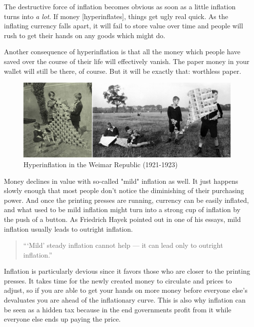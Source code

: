 The destructive force of inflation becomes obvious as soon as a little
inflation turns into \textit{a lot}. If money [hyperinflates], things get ugly
real quick. As the inflating currency falls apart, it will fail to store
value over time and people will rush to get their hands on any goods
which might do.

Another consequence of hyperinflation is that all the money which people
have saved over the course of their life will effectively vanish. The
paper money in your wallet will still be there, of course. But it will
be exactly that: worthless paper.

\begin{figure}
  \includegraphics{assets/images/children-playing-with-money.png}
  \caption{Hyperinflation in the Weimar Republic (1921-1923)}
  \label{fig:children-playing-with-money}
\end{figure}

Money declines in value with so-called "mild" inflation as well. It
just happens slowly enough that most people don't notice the diminishing
of their purchasing power. And once the printing presses are running,
currency can be easily inflated, and what used to be mild inflation
might turn into a strong cup of inflation by the push of a button. As
Friedrich Hayek pointed out in one of his essays, mild inflation usually
leads to outright inflation.

\begin{quotation}
```Mild' steady inflation cannot help --- it can lead only to outright
inflation.''
\end{quotation}

Inflation is particularly devious since it favors those who are closer
to the printing presses. It takes time for the newly created money to
circulate and prices to adjust, so if you are able to get your hands on
more money before everyone else's devaluates you are ahead of the
inflationary curve. This is also why inflation can be seen as a hidden
tax because in the end governments profit from it while everyone else
ends up paying the price.

